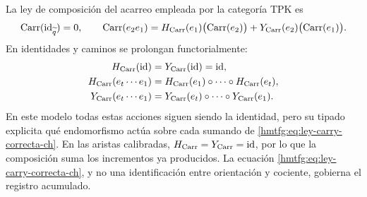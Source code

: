 La ley de composición del acarreo empleada por la categoría TPK es
\begin{equation}
 \operatorname{Carr}(\operatorname{id}_{\widetilde q})=0,\qquad
 \operatorname{Carr}(e_2e_1)
 =H_{\rm Carr}(e_1)\bigl(\operatorname{Carr}(e_2)\bigr)
  +Y_{\rm Carr}(e_2)\bigl(\operatorname{Carr}(e_1)\bigr).
 \label{hmtfg:eq:ley-carry-correcta-ch}
\end{equation}
En identidades y caminos se prolongan functorialmente:
\[
\begin{aligned}
 H_{\rm Carr}(\operatorname{id})
   &=Y_{\rm Carr}(\operatorname{id})=\operatorname{id},\\
 H_{\rm Carr}(e_t\cdots e_1)
   &=H_{\rm Carr}(e_1)\circ\cdots\circ H_{\rm Carr}(e_t),\\
 Y_{\rm Carr}(e_t\cdots e_1)
   &=Y_{\rm Carr}(e_t)\circ\cdots\circ Y_{\rm Carr}(e_1).
\end{aligned}
\]
En este modelo todas estas acciones siguen siendo la identidad, pero
su tipado explicita qué endomorfismo actúa sobre cada sumando de
\eqref{hmtfg:eq:ley-carry-correcta-ch}.
En las aristas calibradas, \(H_{\rm Carr}=Y_{\rm Carr}=\operatorname{id}\),
por lo que la composición suma los incrementos ya producidos. La ecuación
\eqref{hmtfg:eq:ley-carry-correcta-ch}, y no una identificación entre orientación y
cociente, gobierna el registro acumulado.

